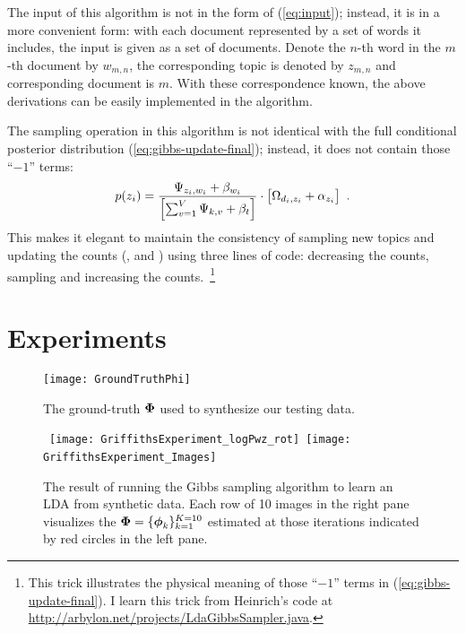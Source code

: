 The input of this algorithm is not in the form of (\ref{eq:input});
instead, it is in a more convenient form: with each document
represented by a set of words it includes, the input is given as a set
of documents.  Denote the $n$-th word in the $m$-th document by
$w_{m,n}$, the corresponding topic is denoted by $z_{m,n}$ and
corresponding document is $m$.  With these correspondence known, the
above derivations can be easily implemented in the algorithm.

The sampling operation in this algorithm is not identical with the
full conditional posterior distribution (\ref{eq:gibbs-update-final});
instead, it does not contain those ``$-1$'' terms:
\begin{equation}
  \label{eq:gibbs-update-real}
  \begin{split}
    p(z_i)
    =
    \frac{
      \Psi_{z_i,w_i} + \beta_{w_i}
    }{
      \left[ \sum_{v=1}^{V}  \Psi_{k,v} + \beta_{t} \right]
    }
    \cdot
    \big[
      \Omega_{d_i,z_i} + \alpha_{z_i}
    \big]
    \enspace.
  \end{split}
\end{equation}
This makes it elegant to maintain the consistency of sampling new
topics and updating the counts (,  and )
using three lines of code: decreasing the counts, sampling and
increasing the counts.~\footnote{This trick illustrates the physical
  meaning of those ``$-1$'' terms in (\ref{eq:gibbs-update-final}).  I
  learn this trick from Heinrich's code at
  \url{http://arbylon.net/projects/LdaGibbsSampler.java}.}


\section{Experiments}

\begin{figure}[!t]
  \centering
  \texttt{[image: GroundTruthPhi]}
  \caption{The ground-truth $\boldsymbol{\Phi}$ used to synthesize our testing data.}
  \label{fig:ground-truth-Phi}
\end{figure}



\begin{figure}[!t]
  \centering
  \mbox{
  \texttt{[image: GriffithsExperiment\_logPwz\_rot]}
  \hspace{-0.5cm}
  \texttt{[image: GriffithsExperiment\_Images]}
}
\caption{The result of running the Gibbs sampling algorithm to learn
  an LDA from synthetic data.  Each row of 10 images in the right pane
  visualizes the $\boldsymbol{\Phi}=\{\boldsymbol{\phi}_{k}\}_{k=1}^{K=10}$ estimated at
  those iterations indicated by red circles in the left pane.}
  \label{fig:correctness-test}
\end{figure}


